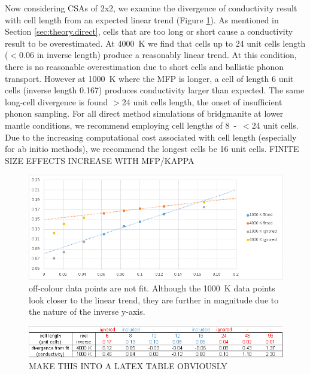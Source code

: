 \documentclass[%
preprint,                                  %
nofootinbib,
 amsmath,amssymb,
 aps,
]{revtex4-1}
\begin{document}
Now considering CSAs of 2x2, we examine the divergence of conductivity result with cell length from an expected linear trend (Figure \ref{fig:direct_length_graph}). As mentioned in Section \ref{sec:theory.direct}, cells that are too long or short cause a conductivity result to be overestimated. At 4000~K we find that cells up to 24 unit cells length ($<$0.06 in inverse length) produce a reasonably linear trend. At this condition, there is no reasonable overestimation due to short cells and ballistic phonon transport. However at 1000~K where the MFP is longer, a cell of length 6 unit cells (inverse length 0.167) produces conductivity larger than expected. The same long-cell divergence is found $>$24 unit cells length, the onset of insufficient phonon sampling. For all direct method simulations of bridgmanite at lower mantle conditions, we recommend employing cell lengths of 8~-~$<$24 unit cells. Due to the increasing computational cost associated with cell length (especially for ab initio methods), we recommend the longest cells be 16 unit cells. FINITE SIZE EFFECTS INCREASE WITH MFP/KAPPA

\begin{figure}[h]
  \includegraphics[width=\linewidth]{images/direct_length_graph.png}
  \caption{off-colour data points are not fit. Although the 1000~K data points look closer to the linear trend, they are further in magnitude due to the nature of the inverse y-axis.}
  \label{fig:direct_length_graph}
\end{figure}

\begin{figure}[h]
  \includegraphics[width=\linewidth]{images/direct_length_table.png}
  \caption{MAKE THIS INTO A LATEX TABLE OBVIOUSLY}
  \label{fig:direct_length_table}
\end{figure}
\end{document}
